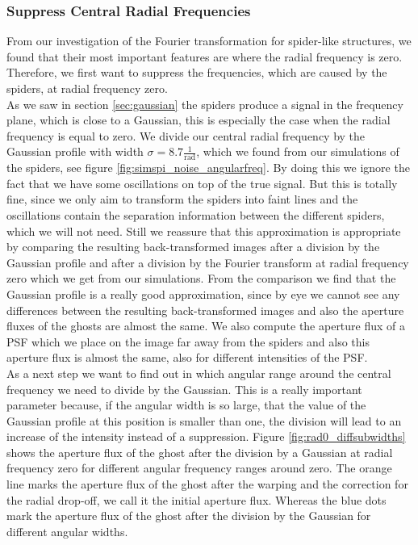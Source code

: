 \subsubsection{Suppress Central Radial Frequencies}
\label{sec:sup_cen_radialfreq}
From our investigation of the Fourier transformation for spider-like structures, we found that their most important features are where the radial frequency is zero. Therefore, we first want to suppress the frequencies, which are caused by the spiders, at radial frequency zero.\\
As we saw in section \ref{sec:gaussian} the spiders produce a signal in the frequency plane, which is close to a Gaussian, this is especially the case when the radial frequency is equal to zero. We divide our central radial frequency by the Gaussian profile with width $\sigma = 8.7 \frac{1}{\mathrm{rad}}$, which we found from our simulations of the spiders, see figure \ref{fig:simspi_noise_angularfreq}. By doing this we ignore the fact that we have some oscillations on top of the true signal. But this is totally fine, since we only aim to transform the spiders into faint lines and the oscillations contain the separation information between the different spiders, which we will not need. Still we reassure that this approximation is appropriate by comparing the resulting back-transformed images after a division by the Gaussian profile and after a division by the Fourier transform at radial frequency zero which we get from our simulations. From the comparison we find that the Gaussian profile is a really good approximation, since by eye we cannot see any differences between the resulting back-transformed images and also the aperture fluxes of the ghosts are almost the same. We also compute the aperture flux of a PSF which we place on the image far away from the spiders and also this aperture flux is almost the same, also for different intensities of the PSF.\\
As a next step we want to find out in which angular range around the central frequency we need to divide by the Gaussian. This is a really important parameter because, if the angular width is so large, that the value of the Gaussian profile at this position is smaller than one, the division will lead to an increase of the intensity instead of a suppression. Figure \ref{fig:rad0_diffsubwidths} shows the aperture flux of the ghost after the division by a Gaussian at radial frequency zero for different angular frequency ranges around zero. The orange line marks the aperture flux of the ghost after the warping and the correction for the radial drop-off, we call it the initial aperture flux. Whereas the blue dots mark the aperture flux of the ghost after the division by the Gaussian for different angular widths.\\
